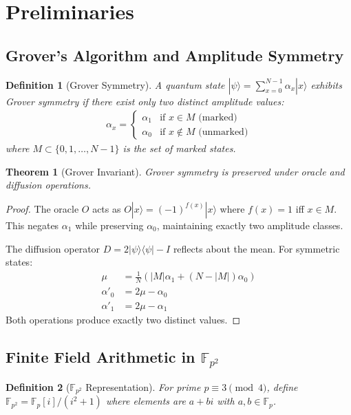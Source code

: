 \documentclass[11pt,a4paper]{article}
\newtheorem{theorem}{Theorem}
\newtheorem{definition}{Definition}
\begin{document}
\section{Preliminaries}

\subsection{Grover's Algorithm and Amplitude Symmetry}

\begin{definition}[Grover Symmetry]
A quantum state $|\psi\rangle = \sum_{x=0}^{N-1} \alpha_x |x\rangle$ exhibits \emph{Grover symmetry} if there exist only two distinct amplitude values:
\begin{align}
\alpha_x = \begin{cases}
\alpha_1 & \text{if } x \in M \text{ (marked)} \\
\alpha_0 & \text{if } x \notin M \text{ (unmarked)}
\end{cases}
\end{align}
where $M \subset \{0, 1, \ldots, N-1\}$ is the set of marked states.
\end{definition}

\begin{theorem}[Grover Invariant]
Grover symmetry is preserved under oracle and diffusion operations.
\end{theorem}

\begin{proof}
The oracle $O$ acts as $O|x\rangle = (-1)^{f(x)}|x\rangle$ where $f(x) = 1$ iff $x \in M$. This negates $\alpha_1$ while preserving $\alpha_0$, maintaining exactly two amplitude classes.

The diffusion operator $D = 2|\psi\rangle\langle\psi| - I$ reflects about the mean. For symmetric states:
\begin{align}
\mu &= \frac{1}{N}\left(|M|\alpha_1 + (N-|M|)\alpha_0\right) \\
\alpha'_0 &= 2\mu - \alpha_0 \\
\alpha'_1 &= 2\mu - \alpha_1
\end{align}
Both operations produce exactly two distinct values.
\end{proof}

\subsection{Finite Field Arithmetic in $\mathbb{F}_{p^2}$}

\begin{definition}[$\mathbb{F}_{p^2}$ Representation]
For prime $p \equiv 3 \pmod{4}$, define $\mathbb{F}_{p^2} = \mathbb{F}_p[i]/(i^2 + 1)$ where elements are $a + bi$ with $a, b \in \mathbb{F}_p$.
\end{definition}
\end{document}
